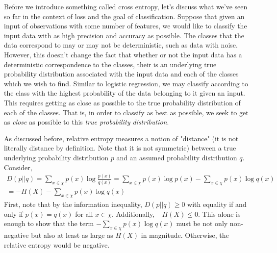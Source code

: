 \documentclass[12pt]{article}
\theoremstyle{definition}
\numberwithin{equation}{section}
\begin{document}
Before we introduce something called cross entropy, let's discuss what we've seen so far in the context of loss and the goal of classification. Suppose that given an input of observations with some number of features, we would like to classify the input data with as high precision and accuracy as possible. The classes that the data correspond to may or may not be deterministic, such as data with noise. However, this doesn't change the fact that whether or not the input data has a deterministic correspondence to the classes, their is an underlying true probability distribution associated with the input data and each of the classes which we wish to find.  Similar to logistic regression, we may classify according to the class with the highest probability of the data belonging to it given an input. This requires getting as close as possible to the true probability distribution of each of the classes. That is, in order to classify as best as possible, we seek to get as \emph{close} as possible to this \emph{true probability distribution}.

As discussed before, relative entropy measures a notion of "distance" (it is not literally distance by definition. Note that it is not symmetric) between a true underlying probability distribution $p$ and an assumed probability distribution $q$. Consider,
\begin{gather*}
    D(p||q) = \sum_{x\in\chi}p(x)\log \frac{p(x)}{q(x)} = \sum_{x\in\chi}p(x)\log p(x) - \sum_{x\in\chi}p(x)\log q(x) \\
    = -H(X) - \sum_{x\in\chi}p(x)\log q(x)
\end{gather*}
First, note that by the information inequality, $D(p||q)\geq 0$ with equality if and only if $p(x) = q(x)$ for all $x\in\chi$. Additionally, $-H(X)\leq 0$. This alone is enough to show that the term $-\sum_{x\in\chi}p(x)\log q(x)$ must be not only non-negative but also at least as large as $H(X)$ in magnitude. Otherwise, the relative entropy would be negative.
\end{document}
